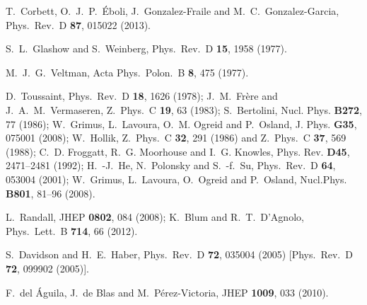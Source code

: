   T.~Corbett, O.~J.~P.~\'Eboli, J.~Gonzalez-Fraile and M.~C.~Gonzalez-Garcia,
  Phys.\ Rev.\ D {\bf 87}, 015022 (2013).

  S.~L.~Glashow and S.~Weinberg,
  Phys.\ Rev.\ D {\bf 15}, 1958 (1977).

  M.~J.~G.~Veltman,
  Acta Phys.\ Polon.\ B {\bf 8}, 475 (1977).
  
  D.~Toussaint,
  Phys.\ Rev.\ D {\bf 18}, 1626 (1978);
  J.~M.~Fr\`ere and J.~A.~M.~Vermaseren,
  Z.\ Phys.\ C {\bf 19}, 63 (1983);
  S.~Bertolini,
  Nucl. Phys. \textbf{ B272}, 77 (1986);
  W.~Grimus, L.~Lavoura, O.~M. Ogreid and P.~Osland,
  J. Phys. \textbf{ G35}, 075001 (2008);
  W.~Hollik,
  Z.\ Phys.\ C {\bf 32}, 291 (1986) 
  and
  Z.\ Phys.\ C {\bf 37}, 569 (1988);
  C.~D. Froggatt, R.~G. Moorhouse and I.~G. Knowles,
  Phys. Rev. \textbf{ D45}, 2471--2481 (1992);
  H.~-J.~He, N.~Polonsky and S.~-f.~Su,
  Phys.\ Rev.\ D {\bf 64}, 053004 (2001);
  W.~Grimus, L.~Lavoura, O.~Ogreid and P.~Osland,
  Nucl.Phys. \textbf{ B801}, 81--96 (2008).

  L.~Randall,
  JHEP {\bf 0802}, 084 (2008);
  K.~Blum and R.~T.~D'Agnolo,
  Phys.\ Lett.\ B {\bf 714}, 66 (2012).

  S.~Davidson and H.~E.~Haber,
  Phys.\ Rev.\ D {\bf 72}, 035004 (2005)
  [Phys.\ Rev.\ D {\bf 72}, 099902 (2005)].
  
  F.~del \'Aguila, J.~de Blas and M.~P\'erez-Victoria,
  JHEP {\bf 1009}, 033 (2010).
